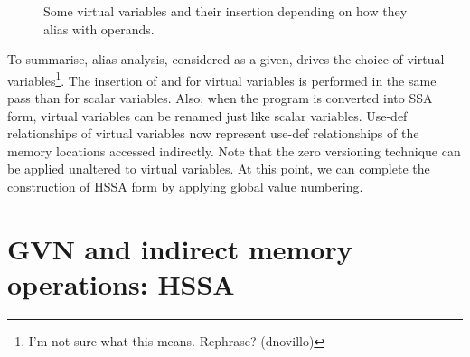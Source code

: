 \begin{figure}
\caption{\label{fig:hssa:virtual_vars}Some virtual variables and their insertion depending on how they alias with operands.}
\end{figure}

To summarise, alias analysis, considered as a given, drives the choice of virtual variables\footnote{I'm not sure what this means.  Rephrase? (dnovillo)}.
The insertion of \mufun and \chifun for virtual variables is performed in the same pass than for scalar variables.
Also, when the program is converted into SSA form, virtual variables can be renamed just like scalar variables.
Use-def relationships of virtual variables now represent use-def relationships of the memory locations accessed indirectly.
Note that the zero versioning technique can be applied unaltered to virtual variables.
At this point, we can complete the construction of HSSA form by applying global value numbering.

\section{GVN and indirect memory operations: HSSA}


